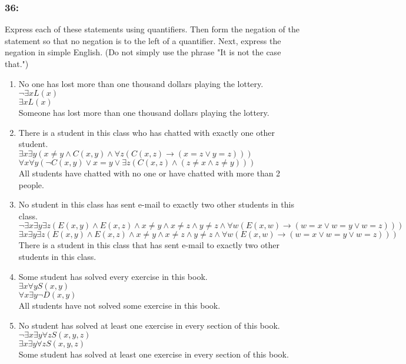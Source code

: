 \documentclass[12pt,en,a4paper]{report}
\begin{document}
	\subsubsection*{36:}
	Express each of these statements using quantifiers. Then form the negation of the statement so that no negation is to the left of a quantifier. Next, express the negation in simple English. (Do not simply use the phrase "It is not the case that.")
	\begin{enumerate}[label=\textbf{\alph*)}]
		\item No one has lost more than one thousand dollars playing the lottery.\\
		$\neg \exists x L(x)$\\
		$\exists x L(x)$\\
		Someone has lost more than one thousand dollars playing the lottery.
		\item There is a student in this class who has chatted with exactly one other student.\\
		$\exists x \exists y (x \neq y \wedge C(x, y) \wedge \forall z (C(x,z) \rightarrow (x=z \vee y=z)))$\\
		$\forall x \forall y (\neg C(x, y) \vee x=y \vee \exists z(C(x, z) \wedge (z \neq x \wedge z \neq y)))$\\
		All students have chatted with no one or have chatted with more than 2 people.
		\item No student in this class has sent e-mail to exactly two other students in this class.\\
		$\neg \exists x \exists y \exists z (E(x, y) \wedge E(x, z) \wedge x \neq y \wedge x \neq z \wedge y \neq z \wedge \forall w (E(x,w) \rightarrow (w=x \vee w=y \vee w=z)))$\\
		$\exists x \exists y \exists z (E(x, y) \wedge E(x, z) \wedge x \neq y \wedge x \neq z \wedge y \neq z \wedge \forall w (E(x,w) \rightarrow (w=x \vee w=y \vee w=z)))$\\
		There is a student in this class that has sent e-mail to exactly two other students in this class.
		\item Some student has solved every exercise in this book.\\
		$\exists x \forall y S(x, y)$\\
		$\forall x \exists y \neg D(x,y)$\\
		All students have not solved some exercise in this book.
		\item No student has solved at least one exercise in every section of this book.\\
		$\neg \exists x \exists y \forall z S(x, y, z)$\\
		$\exists x \exists y \forall z S(x, y, z)$\\
		Some student has solved at least one exercise in every section of this book.
	\end{enumerate}
\end{document}
